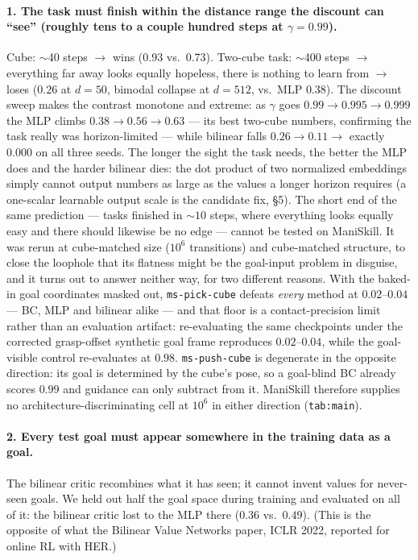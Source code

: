\documentclass[10pt]{article}
\begin{document}
\paragraph{1. The task must finish within the distance range the discount can ``see''
(roughly tens to a couple hundred steps at $\gamma=0.99$).}
Cube: $\sim$40 steps $\to$ wins ($0.93$ vs.\ $0.73$).
Two-cube task: $\sim$400 steps $\to$ everything far away looks equally hopeless, there is
nothing to learn from $\to$ loses ($0.26$ at $d{=}50$, bimodal collapse at $d{=}512$,
vs.\ MLP $0.38$). The discount sweep makes the contrast monotone and extreme: as $\gamma$
goes $0.99 \to 0.995 \to 0.999$ the MLP climbs $0.38 \to 0.56 \to 0.63$ --- its best
two-cube numbers, confirming the task really was horizon-limited --- while bilinear falls
$0.26 \to 0.11 \to$ exactly $0.000$ on all three seeds. The longer the sight the task
needs, the better the MLP does and the harder bilinear dies: the dot product of two
normalized embeddings simply cannot output numbers as large as the values a longer
horizon requires (a one-scalar learnable output scale is the candidate fix, \S5).
The short end of the same prediction --- tasks finished in ${\sim}10$ steps, where
everything looks equally easy and there should likewise be no edge --- cannot be tested
on ManiSkill. It was rerun at cube-matched size ($10^6$ transitions) and cube-matched
structure, to close the loophole that its flatness might be the goal-input problem in
disguise, and it turns out to answer neither way, for two different reasons. With the baked-in goal
coordinates masked out, \texttt{ms-pick-cube} defeats \emph{every} method at
$0.02$--$0.04$ --- BC, MLP and bilinear alike --- and that floor is a contact-precision
limit rather than an evaluation artifact: re-evaluating the same checkpoints under the
corrected grasp-offset synthetic goal frame reproduces $0.02$--$0.04$, while the
goal-visible control re-evaluates at $0.98$. \texttt{ms-push-cube} is degenerate in the
opposite direction: its goal is determined by the cube's pose, so a goal-blind BC already
scores $0.99$ and guidance can only subtract from it. ManiSkill therefore supplies no
architecture-discriminating cell at $10^6$ in either direction (\texttt{tab:main}).

\paragraph{2. Every test goal must appear somewhere in the training data as a goal.}
The bilinear critic recombines what it has seen; it cannot invent values for never-seen
goals. We held out half the goal space during training and evaluated on all of it: the
bilinear critic lost to the MLP there ($0.36$ vs.\ $0.49$). (This is the opposite of what
the Bilinear Value Networks paper, ICLR 2022, reported for online RL with HER.)
\end{document}
